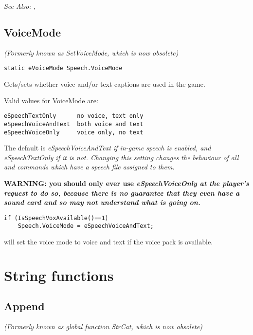 \it{See Also:} ,


\subsection{VoiceMode}\label{Speech.VoiceMode}%

\it{(Formerly known as SetVoiceMode, which is now obsolete)}

\begin{verbatim}
static eVoiceMode Speech.VoiceMode
\end{verbatim}

Gets/sets whether voice and/or text captions are used in the game.

Valid values for VoiceMode are:
\begin{verbatim}
eSpeechTextOnly      no voice, text only
eSpeechVoiceAndText  both voice and text
eSpeechVoiceOnly     voice only, no text
\end{verbatim}
The default is \it{eSpeechVoiceAndText} if in-game speech is enabled, and \it{eSpeechTextOnly} if it
is not. Changing this setting changes the behaviour of all  and
 commands which have a speech file assigned to them.

\bf{WARNING:} you should only ever use \it{eSpeechVoiceOnly} at the player's request to
do so, because there is no guarantee that they even have a sound card and so may
not understand what is going on.

\begin{verbatim}
if (IsSpeechVoxAvailable()==1)
    Speech.VoiceMode = eSpeechVoiceAndText;
\end{verbatim}
will set the voice mode to voice and text if the voice pack is available.



\section{String functions}%


\subsection{Append}\label{String.Append}%

\it{(Formerly known as global function StrCat, which is now obsolete)}

